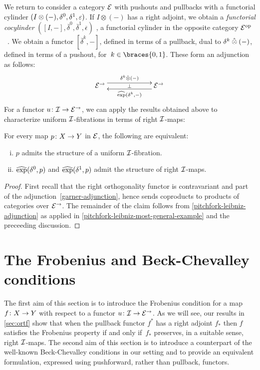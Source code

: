 \documentclass[reqno,10pt,a4paper,oneside,draft]{amsart}
\begin{document}
\medskip

We return to consider a category $\cal{E}$ with pushouts and pullbacks with a functorial cylinder $(\interval \otimes (-), \lcyl, \rcyl, \ccyl)$.
If $I \otimes (-)$ has a right adjoint, we obtain a \emph{functorial cocylinder} $([I, -], \overline{\delta}^0, \overline{\delta}^1, \overline{\epsilon})$ , \ie a functorial cylinder in the opposite category $\catE^{\op}$~\cite{kamps-porter:homotopy}.
We obtain a functor $[\overline{\delta}^k, -]$, defined in terms of a pullback, dual to $\kcyl \hatotimes (-)$, defined in terms of a pushout, for~$k \in \braces{0, 1}$.
These form an adjunction as follows:
\[
\xymatrix@C+4em{
  \cal{E}^\to \ar@<1ex>[r]^{\kcyl \hatotimes (-)} \ar@{}[r]|{\bot} &
  \cal{E}^\to \ar@<1ex>[l]^{\hatexp(\kcyl, -)}
}
\]
For a functor $u \co \cal{I} \to \cal{E}^\to$, we can apply the results obtained above to characterize uniform $\cal{I}$-fibrations in terms of right $\cal{I}$-maps:

\begin{proposition} \label{prod-exp-general}
For every map $p \co X \to Y$ in $\cal{E}$, the following are equivalent:
\begin{enumerate}[(i)]
\item $p$ admits the structure of a uniform $\cal{I}$-fibration.
\item $\hatexp(\lcyl, p)$ and $\hatexp(\rcyl, p)$ admit the structure of right $\cal{I}$-maps.
\end{enumerate}
\end{proposition}

\begin{proof}
First recall that the right orthogonality functor is contravariant and part of the adjunction~\eqref{garner-adjunction}, hence sends coproducts to products of categories over $\cal{E}^\to$.
The remainder of the claim follows from \cref{pitchfork-leibniz-adjunction} as applied in \cref{pitchfork-leibniz-most-general-example} and the preceeding discussion.
\end{proof}


\section{The Frobenius and Beck-Chevalley conditions}
\label{sec:frobc}

The first aim of this section is to introduce the Frobenius condition for a map $f \co X \to Y$ with respect to a functor $u \co \cal{I}
\to \cal{E}^\to$.
As we will see, our results in \cref{sec:ortf} show that when the pullback functor $f^*$ has a right adjoint $f_*$ then $f$ satisfies the Frobenius property if and only if~$f_*$ preserves, in a suitable sense, right $\cal{I}$-maps.
The second aim of this section is to introduce a counterpart of the well-known Beck-Chevalley conditions in our setting
and to provide an equivalent formulation, expressed using  pushforward, rather than pullback, functors.
\end{document}
